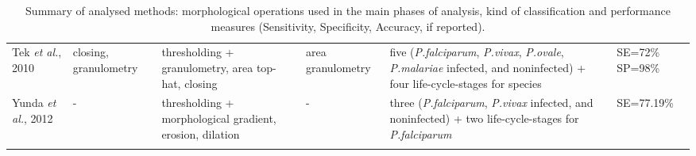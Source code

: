 \begin{longtable}{C{2.1cm} C{2.1cm} C{2.3cm} C{1.5cm} C{2.7cm} C{2.2cm} }
    Tek \emph{et al.}, 2010  &
    	closing, granulometry &
    	thresholding + granulometry, area top-hat, closing  &
    	area granulometry &
    	five (\emph{P.falciparum}, \emph{P.vivax}, \emph{P.ovale}, \emph{P.malariae} infected, and noninfected) +
    four life-cycle-stages for species &
    	SE=72\% SP=98\% \vspace{0.6cm} \\

    Yunda \emph{et al.}, 2012  &
    	- &
    	thresholding + morphological gradient, erosion, dilation  &
    	- &
    	three (\emph{P.falciparum}, \emph{P.vivax} infected, and noninfected) + two life-cycle-stages for \emph{P.falciparum}&
    	SE=77.19\% \\
    	  	
		 \hline
		
				
	\caption{Summary of analysed methods: morphological operations used in the main phases of analysis, kind of classification and performance measures (Sensitivity, Specificity, Accuracy, if reported).} %
	\label{tab:summary_table}
	\end{longtable}

	